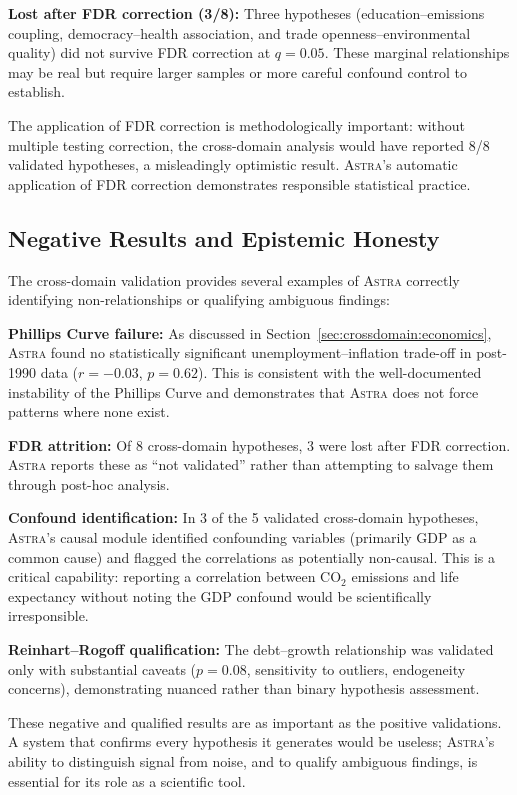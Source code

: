 \documentclass[fleqn,usenatbib]{mnras}
\newcommand{\astra}{\textsc{Astra}\xspace}
\begin{document}
\textbf{Lost after FDR correction (3/8):}
Three hypotheses (education--emissions coupling, democracy--health association, and trade openness--environmental quality) did not survive FDR correction at $q = 0.05$. These marginal relationships may be real but require larger samples or more careful confound control to establish.

The application of FDR correction is methodologically important: without multiple testing correction, the cross-domain analysis would have reported 8/8 validated hypotheses, a misleadingly optimistic result. \astra's automatic application of FDR correction demonstrates responsible statistical practice.

\subsection{Negative Results and Epistemic Honesty}
\label{sec:crossdomain:negatives}

The cross-domain validation provides several examples of \astra correctly identifying non-relationships or qualifying ambiguous findings:

\textbf{Phillips Curve failure:} As discussed in Section~\ref{sec:crossdomain:economics}, \astra found no statistically significant unemployment--inflation trade-off in post-1990 data ($r = -0.03$, $p = 0.62$). This is consistent with the well-documented instability of the Phillips Curve and demonstrates that \astra does not force patterns where none exist.

\textbf{FDR attrition:} Of 8 cross-domain hypotheses, 3 were lost after FDR correction. \astra reports these as ``not validated'' rather than attempting to salvage them through post-hoc analysis.

\textbf{Confound identification:} In 3 of the 5 validated cross-domain hypotheses, \astra's causal module identified confounding variables (primarily GDP as a common cause) and flagged the correlations as potentially non-causal. This is a critical capability: reporting a correlation between CO$_{2}$ emissions and life expectancy without noting the GDP confound would be scientifically irresponsible.

\textbf{Reinhart--Rogoff qualification:} The debt--growth relationship was validated only with substantial caveats ($p = 0.08$, sensitivity to outliers, endogeneity concerns), demonstrating nuanced rather than binary hypothesis assessment.

These negative and qualified results are as important as the positive validations. A system that confirms every hypothesis it generates would be useless; \astra's ability to distinguish signal from noise, and to qualify ambiguous findings, is essential for its role as a scientific tool.
\end{document}
